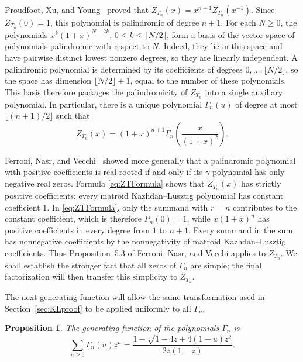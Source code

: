 \documentclass[11pt]{article}
\theoremstyle{plain}
\newtheorem{proposition}[theorem]{Proposition}
\theoremstyle{remark}
\begin{document}
Proudfoot, Xu, and Young~\cite[Proposition~2.3]{ProudfootXuYoung}
proved that
$Z_{T_n}(x)=x^{n+1}Z_{T_n}(x^{-1})$.  Since $Z_{T_n}(0)=1$, this
polynomial is palindromic of degree $n+1$.  For each $N\ge0$, the
polynomials
$x^k(1+x)^{N-2k}$, $0\le k\le\lfloor N/2\rfloor$, form a basis of
the vector space of polynomials palindromic with respect to $N$.
Indeed, they lie in this space and have pairwise distinct lowest
nonzero degrees, so they are linearly independent.  A palindromic
polynomial is determined by its coefficients of degrees
$0,\ldots,\lfloor N/2\rfloor$, so the space has dimension
$\lfloor N/2\rfloor+1$, equal to the number of these polynomials.
This basis therefore packages the palindromicity of $Z_{T_n}$ into a
single auxiliary polynomial.  In particular, there is a unique
polynomial $\Gamma_n(u)$ of degree at most
$\lfloor(n+1)/2\rfloor$ such that
\begin{equation}\label{eq:GammaDef}
Z_{T_n}(x)=(1+x)^{n+1}
\Gamma_n\!\left(\frac{x}{(1+x)^2}\right).
\end{equation}

Ferroni, Nasr, and Vecchi~\cite[Proposition~5.3]{FerroniNasrVecchiGamma}
showed more generally that a palindromic polynomial with positive
coefficients is real-rooted if and only if its $\gamma$-polynomial has
only negative real zeros.  Formula \eqref{eq:ZTFormula} shows that
$Z_{T_n}(x)$ has strictly positive coefficients: every matroid
Kazhdan--Lusztig polynomial has constant coefficient $1$.  In
\eqref{eq:ZTFormula}, only the summand with $r=n$ contributes to the
constant coefficient, which is therefore $P_n(0)=1$, while
$x(1+x)^n$ has positive coefficients in every degree from $1$ to
$n+1$.  Every summand in the sum has nonnegative coefficients by the
nonnegativity of matroid Kazhdan--Lusztig coefficients.  Thus
Proposition~5.3 of Ferroni, Nasr, and Vecchi applies to $Z_{T_n}$.
We shall establish the stronger fact that all zeros of $\Gamma_n$ are
simple; the final factorization will then transfer this simplicity to
$Z_{T_n}$.

The next generating function will allow the same transformation used
in Section~\ref{sec:KLproof} to be applied uniformly to all
$\Gamma_n$.

\begin{proposition}
The generating function of the polynomials $\Gamma_n$ is
\begin{equation}\label{eq:GammaGF}
\sum_{n\ge0}\Gamma_n(u)z^n
=\frac{1-\sqrt{1-4z+4(1-u)z^2}}{2z(1-z)}.
\end{equation}
\end{proposition}
\end{document}
